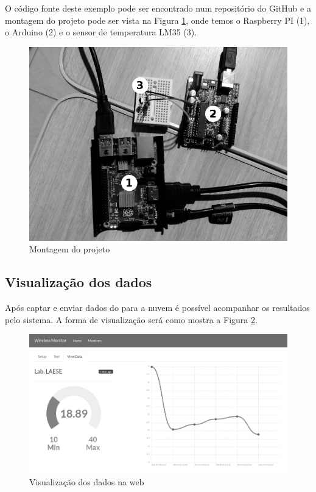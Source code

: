 O código fonte deste exemplo pode ser encontrado num repositório do
GitHub \cite{alves:2016} e a montagem do projeto pode ser vista na
Figura \ref{fig:montagem}, onde temos o Raspberry PI (1), o Arduino (2)
e o sensor de temperatura LM35 (3).

\begin{figure}[h]
    \centering
    \includegraphics[scale=0.35]{img/montagem-grey.jpg}
    \caption{Montagem do projeto} \label{fig:montagem}
\end{figure}

\subsection{Visualização dos dados}\label{visualizauxe7uxe3o-dos-dados}

Após captar e enviar dados do \iot para a nuvem é possível acompanhar os
resultados pelo sistema. A forma de visualização será como mostra a
Figura \ref{fig:view-monitor}.

\begin{figure}[h]
    \centering
    \includegraphics[scale=0.3]{img/temperature-show-grey.png}
    \caption{Visualização dos dados na web} \label{fig:view-monitor}
\end{figure}

